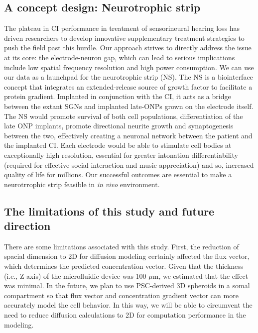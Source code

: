 \documentclass[review]{elsarticle}
\begin{document}
\subsection{A concept design: Neurotrophic strip}
The plateau in CI performance in treatment of sensorineural hearing loss has driven researchers to develop innovative supplementary treatment strategies to push the field past this hurdle. Our approach strives to directly address the issue at its core: the electrode-neuron gap, which can lead to serious implications include low spatial frequency resolution and high power consumption. We can use our data as a launchpad for the neurotrophic strip (NS). The NS is a biointerface concept that integrates an extended-release source of growth factor to facilitate a protein gradient. Implanted in conjunction with the CI, it acts as a bridge between the extant SGNs and implanted late-ONPs grown on the electrode itself. The NS would promote survival of both cell populations, differentiation of the late ONP implants, promote directional neurite growth and synaptogenesis between the two, effectively creating a neuronal network between the patient and the implanted CI. Each electrode would be able to stimulate cell bodies at exceptionally high resolution, essential for greater intonation differentiability (required for effective social interaction and music appreciation) and so, increased quality of life for millions. Our successful outcomes are essential to make a neurotrrophic strip feasible in \textit{in vivo} environment. 

\subsection{The limitations of this study and future direction}
There are some limitations associated with this study.  First, the reduction of spacial dimension to 2D  for diffusion modeling certainly affected the flux vector, which determines the predicted concentration vector. Given that the thickness (i.e., Z-axis) of the microfluidic device was 100 $\mu$m, we estimated that the effect was minimal. In the future, we plan to use PSC-derived 3D spheroids in a somal compartment so that flux vector and concentration gradient vector can more accurately model the cell behavior. In this way, we will be able to circumvent the need to reduce diffusion calculations to 2D for computation performance in the modeling. 
\end{document}
